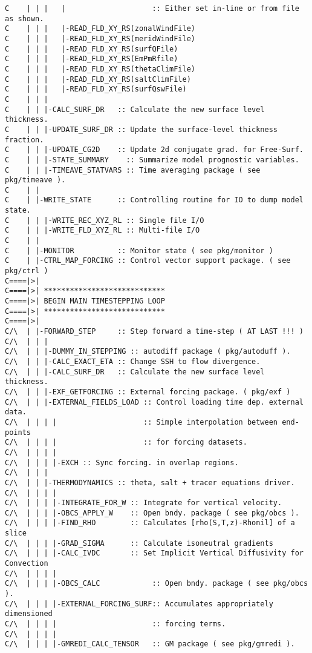 {\begin{verbatim}
C    | | |   |                    :: Either set in-line or from file as shown.
C    | | |   |-READ_FLD_XY_RS(zonalWindFile)
C    | | |   |-READ_FLD_XY_RS(meridWindFile)
C    | | |   |-READ_FLD_XY_RS(surfQFile)
C    | | |   |-READ_FLD_XY_RS(EmPmRfile)
C    | | |   |-READ_FLD_XY_RS(thetaClimFile)
C    | | |   |-READ_FLD_XY_RS(saltClimFile)
C    | | |   |-READ_FLD_XY_RS(surfQswFile)
C    | | |
C    | | |-CALC_SURF_DR   :: Calculate the new surface level thickness.
C    | | |-UPDATE_SURF_DR :: Update the surface-level thickness fraction.
C    | | |-UPDATE_CG2D    :: Update 2d conjugate grad. for Free-Surf.
C    | | |-STATE_SUMMARY    :: Summarize model prognostic variables.
C    | | |-TIMEAVE_STATVARS :: Time averaging package ( see pkg/timeave ).
C    | |
C    | |-WRITE_STATE      :: Controlling routine for IO to dump model state.
C    | | |-WRITE_REC_XYZ_RL :: Single file I/O
C    | | |-WRITE_FLD_XYZ_RL :: Multi-file I/O
C    | | 
C    | |-MONITOR          :: Monitor state ( see pkg/monitor )
C    | |-CTRL_MAP_FORCING :: Control vector support package. ( see pkg/ctrl )
C====|>| 
C====|>| ****************************
C====|>| BEGIN MAIN TIMESTEPPING LOOP
C====|>| ****************************
C====|>| 
C/\  | |-FORWARD_STEP     :: Step forward a time-step ( AT LAST !!! )
C/\  | | |
C/\  | | |-DUMMY_IN_STEPPING :: autodiff package ( pkg/autoduff ).
C/\  | | |-CALC_EXACT_ETA :: Change SSH to flow divergence.
C/\  | | |-CALC_SURF_DR   :: Calculate the new surface level thickness.
C/\  | | |-EXF_GETFORCING :: External forcing package. ( pkg/exf )
C/\  | | |-EXTERNAL_FIELDS_LOAD :: Control loading time dep. external data.
C/\  | | | |                    :: Simple interpolation between end-points 
C/\  | | | |                    :: for forcing datasets.
C/\  | | | |                  
C/\  | | | |-EXCH :: Sync forcing. in overlap regions.
C/\  | | |
C/\  | | |-THERMODYNAMICS :: theta, salt + tracer equations driver.
C/\  | | | |
C/\  | | | |-INTEGRATE_FOR_W :: Integrate for vertical velocity.
C/\  | | | |-OBCS_APPLY_W    :: Open bndy. package ( see pkg/obcs ).
C/\  | | | |-FIND_RHO        :: Calculates [rho(S,T,z)-Rhonil] of a slice
C/\  | | | |-GRAD_SIGMA      :: Calculate isoneutral gradients
C/\  | | | |-CALC_IVDC       :: Set Implicit Vertical Diffusivity for Convection
C/\  | | | |
C/\  | | | |-OBCS_CALC            :: Open bndy. package ( see pkg/obcs ).
C/\  | | | |-EXTERNAL_FORCING_SURF:: Accumulates appropriately dimensioned 
C/\  | | | |                      :: forcing terms.
C/\  | | | |
C/\  | | | |-GMREDI_CALC_TENSOR   :: GM package ( see pkg/gmredi ).

\end{verbatim}}
